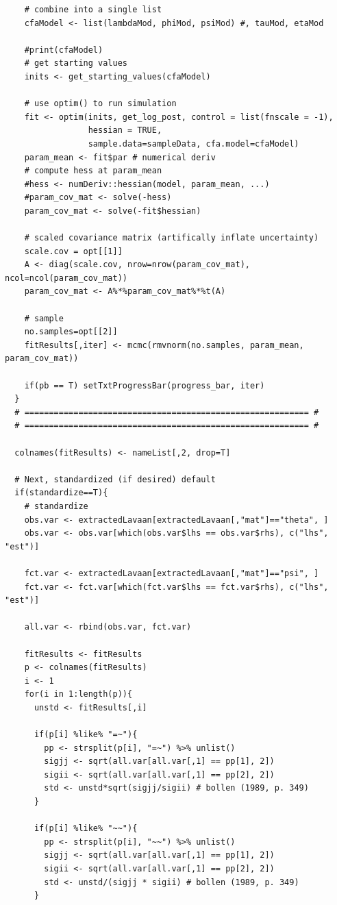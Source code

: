 \documentclass[man, noextraspace, floatsintext, 12pt]{apa7}
\begin{document}
\begin{lstlisting}
    # combine into a single list
    cfaModel <- list(lambdaMod, phiMod, psiMod) #, tauMod, etaMod
    
    #print(cfaModel)
    # get starting values
    inits <- get_starting_values(cfaModel) 
    
    # use optim() to run simulation
    fit <- optim(inits, get_log_post, control = list(fnscale = -1),
                 hessian = TRUE,
                 sample.data=sampleData, cfa.model=cfaModel)
    param_mean <- fit$par # numerical deriv
    # compute hess at param_mean
    #hess <- numDeriv::hessian(model, param_mean, ...)
    #param_cov_mat <- solve(-hess)
    param_cov_mat <- solve(-fit$hessian)
    
    # scaled covariance matrix (artifically inflate uncertainty)
    scale.cov = opt[[1]]
    A <- diag(scale.cov, nrow=nrow(param_cov_mat), ncol=ncol(param_cov_mat))
    param_cov_mat <- A%*%param_cov_mat%*%t(A)
    
    # sample
    no.samples=opt[[2]]
    fitResults[,iter] <- mcmc(rmvnorm(no.samples, param_mean, param_cov_mat))
    
    if(pb == T) setTxtProgressBar(progress_bar, iter)
  }
  # ========================================================== #
  # ========================================================== #
  
  colnames(fitResults) <- nameList[,2, drop=T]
  
  # Next, standardized (if desired) default
  if(standardize==T){
    # standardize
    obs.var <- extractedLavaan[extractedLavaan[,"mat"]=="theta", ]
    obs.var <- obs.var[which(obs.var$lhs == obs.var$rhs), c("lhs", "est")]
    
    fct.var <- extractedLavaan[extractedLavaan[,"mat"]=="psi", ]
    fct.var <- fct.var[which(fct.var$lhs == fct.var$rhs), c("lhs", "est")]
    
    all.var <- rbind(obs.var, fct.var)
    
    fitResults <- fitResults
    p <- colnames(fitResults)
    i <- 1
    for(i in 1:length(p)){
      unstd <- fitResults[,i]
      
      if(p[i] %like% "=~"){
        pp <- strsplit(p[i], "=~") %>% unlist()
        sigjj <- sqrt(all.var[all.var[,1] == pp[1], 2])
        sigii <- sqrt(all.var[all.var[,1] == pp[2], 2])
        std <- unstd*sqrt(sigjj/sigii) # bollen (1989, p. 349)
      }
      
      if(p[i] %like% "~~"){
        pp <- strsplit(p[i], "~~") %>% unlist()
        sigjj <- sqrt(all.var[all.var[,1] == pp[1], 2])
        sigii <- sqrt(all.var[all.var[,1] == pp[2], 2])
        std <- unstd/(sigjj * sigii) # bollen (1989, p. 349)
      }
      

\end{lstlisting}
\end{document}

